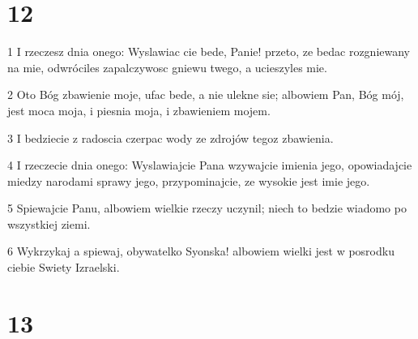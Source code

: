 \chapter{12}

\par 1 I rzeczesz dnia onego: Wyslawiac cie bede, Panie! przeto, ze bedac rozgniewany na mie, odwróciles zapalczywosc gniewu twego, a ucieszyles mie.
\par 2 Oto Bóg zbawienie moje, ufac bede, a nie ulekne sie; albowiem Pan, Bóg mój, jest moca moja, i piesnia moja, i zbawieniem mojem.
\par 3 I bedziecie z radoscia czerpac wody ze zdrojów tegoz zbawienia.
\par 4 I rzeczecie dnia onego: Wyslawiajcie Pana wzywajcie imienia jego, opowiadajcie miedzy narodami sprawy jego, przypominajcie, ze wysokie jest imie jego.
\par 5 Spiewajcie Panu, albowiem wielkie rzeczy uczynil; niech to bedzie wiadomo po wszystkiej ziemi.
\par 6 Wykrzykaj a spiewaj, obywatelko Syonska! albowiem wielki jest w posrodku ciebie Swiety Izraelski.

\chapter{13}


